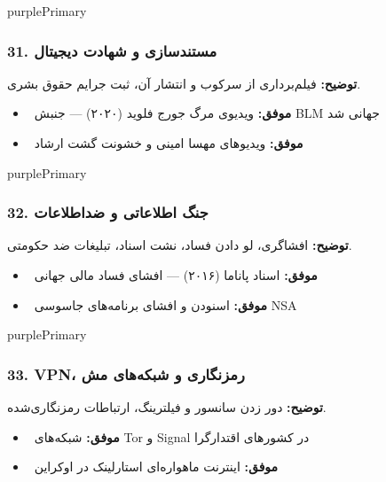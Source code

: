 \documentclass[a4paper,12pt]{article}
\newcommand{\success}[1]{\textcolor{greenPrimary}{\faCheckCircle\ \textbf{موفق:}} #1}
\newcommand{\methodnum}[1]{\textcolor{purpleLight}{\textbf{#1.}}}
\begin{document}
\begin{methodcard}{purplePrimary}
\subsubsection{\methodnum{31} مستندسازی و شهادت دیجیتال}
\textbf{توضیح:} فیلم‌برداری از سرکوب و انتشار آن، ثبت جرایم حقوق بشری.

\begin{itemize}[label=\textcolor{greenPrimary}{\faCheckCircle}]
  \item \success{ویدیوی مرگ جورج فلوید (۲۰۲۰) — جنبش BLM جهانی شد}
  \item \success{ویدیوهای مهسا امینی و خشونت گشت ارشاد}
\end{itemize}
\end{methodcard}

\begin{methodcard}{purplePrimary}
\subsubsection{\methodnum{32} جنگ اطلاعاتی و ضداطلاعات}
\textbf{توضیح:} افشاگری، لو دادن فساد، نشت اسناد، تبلیغات ضد حکومتی.

\begin{itemize}[label=\textcolor{greenPrimary}{\faCheckCircle}]
  \item \success{اسناد پاناما (۲۰۱۶) — افشای فساد مالی جهانی}
  \item \success{اسنودن و افشای برنامه‌های جاسوسی NSA}
\end{itemize}
\end{methodcard}

\begin{methodcard}{purplePrimary}
\subsubsection{\methodnum{33} VPN، رمزنگاری و شبکه‌های مش}
\textbf{توضیح:} دور زدن سانسور و فیلترینگ، ارتباطات رمزنگاری‌شده.

\begin{itemize}[label=\textcolor{greenPrimary}{\faCheckCircle}]
  \item \success{شبکه‌های Tor و Signal در کشورهای اقتدارگرا}
  \item \success{اینترنت ماهواره‌ای استارلینک در اوکراین}
\end{itemize}
\end{methodcard}
\end{document}
